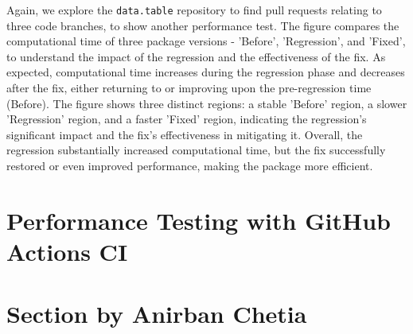 \noindent Again, we explore the \texttt{data.table} repository to find pull requests relating to three code branches, to show another performance test. The figure compares the computational time of three package versions - 'Before', 'Regression', and 'Fixed', to understand the impact of the regression and the effectiveness of the fix. As expected, computational time increases during the regression phase and decreases after the fix, either returning to or improving upon the pre-regression time (Before). The figure shows three distinct regions: a stable 'Before' region, a slower 'Regression' region, and a faster 'Fixed' region, indicating the regression's significant impact and the fix's effectiveness in mitigating it. Overall, the regression substantially increased computational time, but the fix successfully restored or even improved performance, making the package more efficient.\\

\section{Performance Testing with GitHub Actions CI}
\section{Section by Anirban Chetia}

